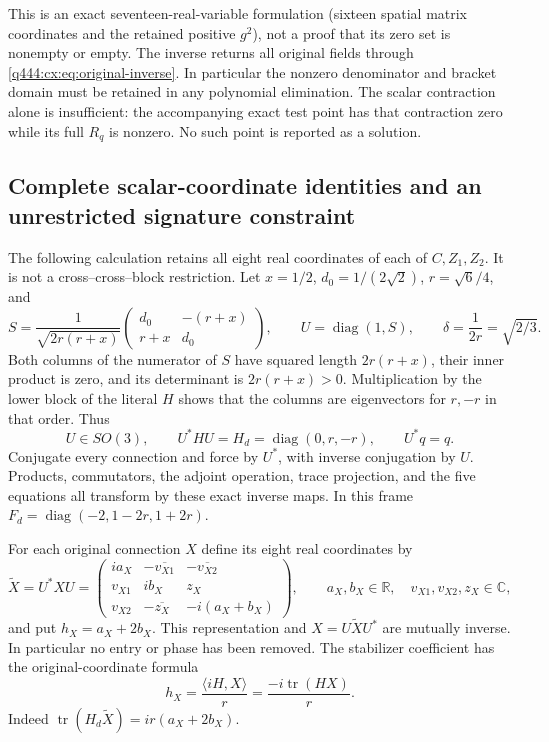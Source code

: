 This is an exact seventeen-real-variable formulation (sixteen spatial
matrix coordinates and the retained positive $g^2$), not a proof that
its zero set is nonempty or empty. The inverse returns all original
fields through \eqref{q444:cx:eq:original-inverse}. In particular the
nonzero denominator and bracket domain must be retained in any
polynomial elimination. The scalar contraction alone is insufficient:
the accompanying exact test point has that contraction zero while
its full $R_q$ is nonzero. No such point is reported as a solution.

\subsection{Complete scalar-coordinate identities and an unrestricted signature constraint}
\label{q444:complex-scalar-coordinate-section}

The following calculation retains all eight real coordinates of each
of $C,Z_1,Z_2$. It is not a cross--cross--block restriction.
Let $x=1/2$, $d_0=1/(2\sqrt2)$, $r=\sqrt6/4$, and
\[
S=\frac1{\sqrt{2r(r+x)}}
\begin{pmatrix}d_0&-(r+x)\\r+x&d_0\end{pmatrix},\qquad
U=\operatorname{diag}(1,S),\qquad\delta=\frac1{2r}=\sqrt{2/3}.
\]
Both columns of the numerator of $S$ have squared length $2r(r+x)$,
their inner product is zero, and its determinant is $2r(r+x)>0$.
Multiplication by the lower block of the literal $H$ shows that the
columns are eigenvectors for $r,-r$ in that order. Thus
\[
U\in SO(3),\qquad U^*HU=H_d=\operatorname{diag}(0,r,-r),\qquad U^*q=q.
\]
Conjugate every connection and force by $U^*$, with inverse conjugation
by $U$. Products, commutators, the adjoint operation, trace projection,
and the five equations all transform by these exact inverse maps.
In this frame $F_d=\operatorname{diag}(-2,1-2r,1+2r)$.

For each original connection $X$ define its eight real coordinates by
\begin{equation}
\widetilde X=U^*XU=
\begin{pmatrix}
ia_X&-\overline{v_{X1}}&-\overline{v_{X2}}\\
v_{X1}&ib_X&z_X\\
v_{X2}&-\overline{z_X}&-i(a_X+b_X)
\end{pmatrix},\qquad
a_X,b_X\in\mathbb R,\quad v_{X1},v_{X2},z_X\in\mathbb C,
\label{q444:complex-eight-coordinates}
\end{equation}
and put $h_X=a_X+2b_X$. This representation and $X=U\widetilde XU^*$
are mutually inverse. In particular no entry or phase has been removed.
The stabilizer coefficient has the original-coordinate formula
\begin{equation}
h_X=\frac{\langle iH,X\rangle}{r}
=\frac{-i\operatorname{tr}(HX)}r.
\label{q444:complex-stabilizer-coefficient}
\end{equation}
Indeed $\operatorname{tr}(H_d\widetilde X)=ir(a_X+2b_X)$.

